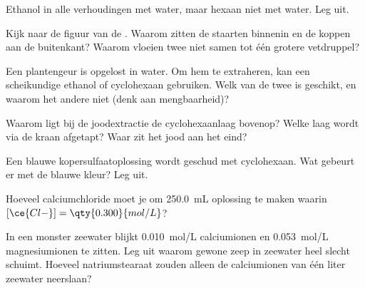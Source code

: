 \begin{exercise}[$\star\star$]\label{exo:g11:dissolution:7}
Ethanol   in alle verhoudingen met water, maar hexaan
  niet met water. Leg uit.
\end{exercise}

\begin{exercise}[$\star\star$]\label{exo:g11:dissolution:8}
Kijk naar de figuur van de . Waarom zitten de staarten binnenin en de
koppen aan de buitenkant? Waarom vloeien twee  niet samen tot één
grotere vetdruppel?
\end{exercise}

\begin{exercise}[$\star\star$]\label{exo:g11:dissolution:9}
Een plantengeur is opgelost in water. Om hem te extraheren, kan een
scheikundige ethanol of cyclohexaan gebruiken. Welk van de twee is
geschikt, en waarom het andere niet (denk aan mengbaarheid)?
\end{exercise}

\begin{exercise}[$\star\star$]\label{exo:g11:dissolution:10}
Waarom ligt bij de joodextractie de cyclohexaanlaag bovenop? Welke laag
wordt via de kraan afgetapt? Waar zit het jood aan het eind?
\end{exercise}

\begin{exercise}[$\star\star$]\label{exo:g11:dissolution:11}
Een blauwe kopersulfaatoplossing wordt geschud met cyclohexaan. Wat
gebeurt er met de blauwe kleur? Leg uit.
\end{exercise}

\begin{exercise}[$\star\star\star$]\label{exo:g11:dissolution:12}
Hoeveel calciumchloride moet je  om \qty{250.0}{mL} oplossing te
maken waarin $[\ce{Cl-}] = \qty{0.300}{mol/L}$?
\end{exercise}

\begin{exercise}[$\star\star\star$]\label{exo:g11:dissolution:13}
In een monster zeewater blijkt \qty{0.010}{mol/L} calciumionen en
\qty{0.053}{mol/L} magnesiumionen te zitten. Leg uit waarom gewone zeep in
zeewater heel slecht schuimt. Hoeveel natriumstearaat zouden alleen de
calciumionen van één liter zeewater neerslaan?
\end{exercise}

